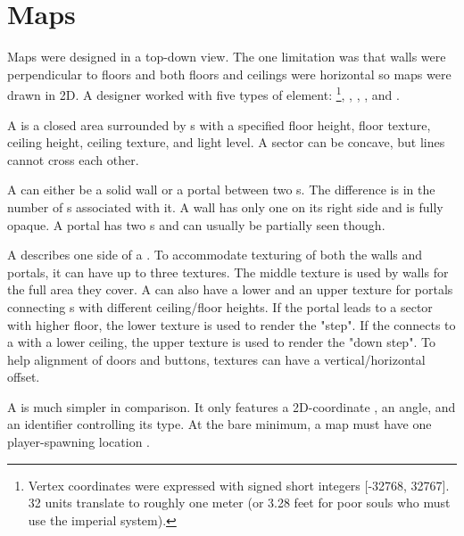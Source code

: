 

\section{Maps}
Maps were designed in a top-down view. The one limitation was that walls were perpendicular to floors and both floors and ceilings were horizontal so maps were drawn in 2D. A designer worked with five types of element: \footnote{Vertex coordinates were expressed with signed short integers [-32768, 32767]. 32 units translate to roughly one meter (or 3.28 feet for poor souls who must use the imperial system).}, , , , and .\\
\par
{}

\par
A  is a closed area surrounded by s with a specified floor height, floor texture, ceiling height, ceiling texture, and light level. A sector can be concave, but lines cannot cross each other.\\
\par
A  can either be a solid wall or a portal between two s. The difference is in the number of s associated with it. A wall has only one  on its right side and is fully opaque. A portal has two s and can usually be partially seen though.\\
\par
A  describes one side of a . To accommodate texturing of both the walls and portals, it can have up to three textures. The middle texture is used by walls for the full area they cover. A  can also have a lower and an upper texture for portals connecting s with different ceiling/floor heights. If the portal leads to a sector with higher floor, the lower texture is used to render the "step". If the  connects to a  with a lower ceiling, the upper texture is used to render the "down step". To help alignment of doors and buttons,  textures can have a vertical/horizontal offset. \\
\par
A  is much simpler in comparison. It only features a 2D-coordinate , an angle, and an identifier controlling its type. At the bare minimum, a map must have one player-spawning location .\\

